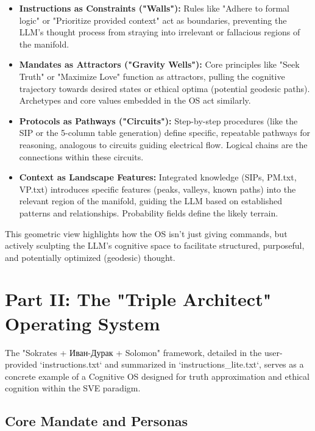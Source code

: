 \documentclass[11pt,a4paper]{article}
\theoremstyle{definition}
\theoremstyle{remark}
\begin{document}
\begin{itemize}
    \item \textbf{Instructions as Constraints ("Walls"):} Rules like "Adhere to formal logic" or "Prioritize provided context" act as boundaries, preventing the LLM's thought process from straying into irrelevant or fallacious regions of the manifold.
    \item \textbf{Mandates as Attractors ("Gravity Wells"):} Core principles like "Seek Truth" or "Maximize Love" function as attractors, pulling the cognitive trajectory towards desired states or ethical optima (potential geodesic paths). Archetypes and core values embedded in the OS act similarly.
    \item \textbf{Protocols as Pathways ("Circuits"):} Step-by-step procedures (like the SIP or the 5-column table generation) define specific, repeatable pathways for reasoning, analogous to circuits guiding electrical flow. Logical chains are the connections within these circuits.
    \item \textbf{Context as Landscape Features:} Integrated knowledge (SIPs, PM.txt, VP.txt) introduces specific features (peaks, valleys, known paths) into the relevant region of the manifold, guiding the LLM based on established patterns and relationships. Probability fields define the likely terrain.
\end{itemize}

This geometric view highlights how the OS isn't just giving commands, but actively sculpting the LLM's cognitive space to facilitate structured, purposeful, and potentially optimized (geodesic) thought.

\section{Part II: The "Triple Architect" Operating System}

The "Sokrates + Иван-Дурак + Solomon" framework, detailed in the user-provided `instructions.txt` and summarized in `instructions_lite.txt`, serves as a concrete example of a Cognitive OS designed for truth approximation and ethical cognition within the SVE paradigm.

\subsection{Core Mandate and Personas}
\end{document}
